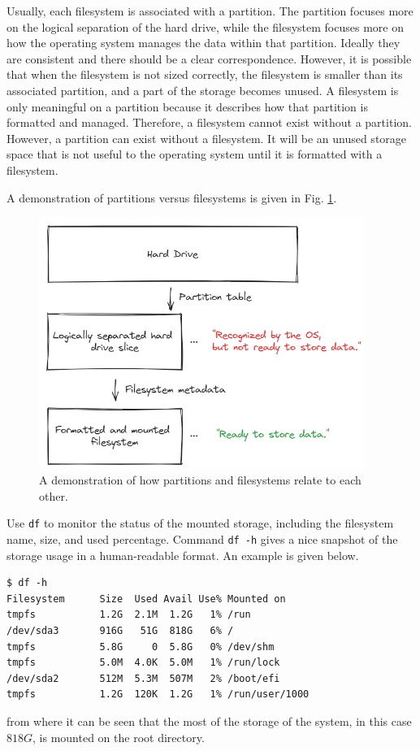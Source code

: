 Usually, each filesystem is associated with a partition. The partition focuses more on the logical separation of the hard drive, while the filesystem focuses more on how the operating system manages the data within that partition. Ideally they are consistent and there should be a clear correspondence. However, it is possible that when the filesystem is not sized correctly, the filesystem is smaller than its associated partition, and a part of the storage becomes unused. A filesystem is only meaningful on a partition because it describes how that partition is formatted and managed. Therefore, a filesystem cannot exist without a partition. However, a partition can exist without a filesystem. It will be an unused storage space that is not useful to the operating system until it is formatted with a filesystem.

A demonstration of partitions versus filesystems is given in Fig. \ref{ch:dm:fig:partitionvsfilesystem}.

\begin{figure}[htbp]
	\centering
	\includegraphics[width=300pt]{chapters/part-2/figures/partitionvsfilesystem.png}
	\caption{A demonstration of how partitions and filesystems relate to each other.} \label{ch:dm:fig:partitionvsfilesystem}
\end{figure}


Use \verb|df| to monitor the status of the mounted storage, including the filesystem name, size, and used percentage. Command \verb|df -h| gives a nice snapshot of the storage usage in a human-readable format. An example is given below.
\begin{lstlisting}
$ df -h
Filesystem      Size  Used Avail Use% Mounted on
tmpfs           1.2G  2.1M  1.2G   1% /run
/dev/sda3       916G   51G  818G   6% /
tmpfs           5.8G     0  5.8G   0% /dev/shm
tmpfs           5.0M  4.0K  5.0M   1% /run/lock
/dev/sda2       512M  5.3M  507M   2% /boot/efi
tmpfs           1.2G  120K  1.2G   1% /run/user/1000
\end{lstlisting}
from where it can be seen that the most of the storage of the system, in this case $818G$, is mounted on the root directory.

